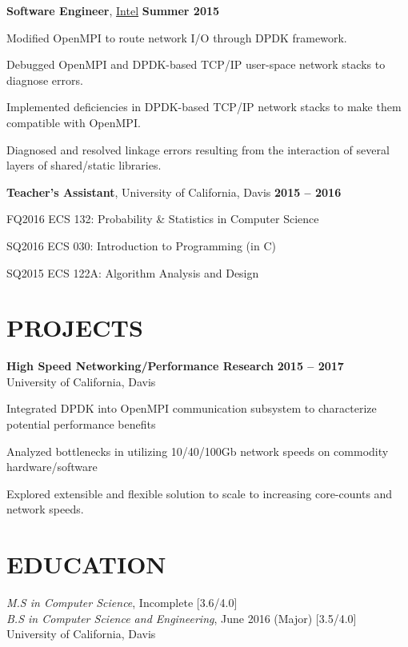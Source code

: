 \documentclass[centered]{res} %
\newcommand{\bullets}[1]{
	\begin{itemize}[noitemsep]
		{#1}
	\end{itemize}
	\vspace{-6pt}
}
\newcommand{\experience}[5]{
	\textbf{#1}, {#2} \hfill \textbf{#3}
	\ifx\hfbuzz#4\hfbuzz
	\else
		\\ {#4}
	\fi
	\bullets{#5}
}
\newcommand{\project}[4]{
	\textbf{#1} \hfill \textbf{#3} \\
	{\small #2}
	\bullets{#4}
}
\begin{document}
\begin{resume}
	\experience{Software Engineer}{\href{https://www.intel.com}{Intel}}{Summer 2015}
	{}{
		\item Modified OpenMPI to route network I/O through DPDK framework.
		\item Debugged OpenMPI and DPDK-based TCP/IP user-space network stacks to diagnose errors.
		\item Implemented deficiencies in DPDK-based TCP/IP network stacks to make them compatible with OpenMPI.
		\item Diagnosed and resolved linkage errors resulting from the interaction of several layers of shared/static libraries.
	}

	\experience{Teacher's Assistant}{University of California, Davis}{2015 -- 2016}
	{}{
		\item[] \hspace{-12pt} FQ2016 ECS 132: Probability \& Statistics in Computer Science %
		\item[] \hspace{-12pt} SQ2016 ECS 030: Introduction to Programming (in C) %
		\item[] \hspace{-12pt} SQ2015 ECS 122A: Algorithm Analysis and Design %
	}

\section{PROJECTS}
	\project{High Speed Networking/Performance Research}{University of California, Davis}{2015 -- 2017}{
		\item Integrated DPDK into OpenMPI communication subsystem to characterize potential performance benefits
		\item Analyzed bottlenecks in utilizing 10/40/100Gb network speeds on commodity hardware/software
		\item Explored extensible and flexible solution to scale to increasing core-counts and network speeds.
	}

\section{EDUCATION}
\textsl{M.S in Computer Science}, Incomplete  \hfill [3.6/4.0]  \\
\textsl{B.S in Computer Science and Engineering}, June 2016 \hfill (Major) [3.5/4.0]  \\
University of California, Davis


\end{resume}
\end{document}
